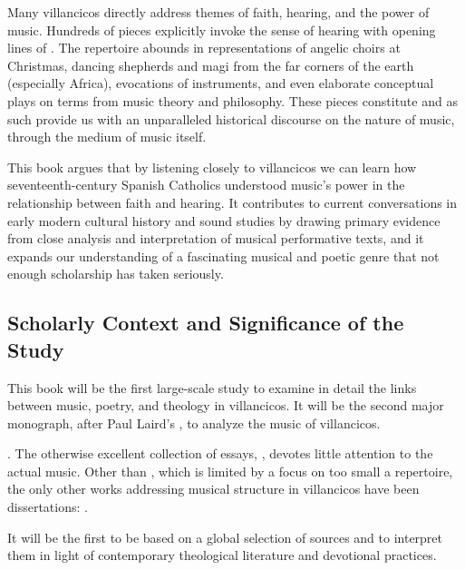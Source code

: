 \documentclass{vcbook-proposal}
\begin{document}
Many villancicos directly address themes of faith, hearing, and the power of 
music.
Hundreds of pieces explicitly invoke the sense of hearing with opening lines of 
  .
The repertoire abounds in representations of angelic choirs at Christmas, 
dancing shepherds and magi from the far corners of the earth (especially 
Africa), evocations of instruments, and even elaborate conceptual plays on 
terms from music theory and philosophy.
These pieces constitute  and as such provide us with 
an unparalleled historical discourse on the nature of music, through the medium 
of music itself.

This book argues that by listening closely to villancicos we can learn how
seventeenth-century Spanish Catholics understood music's power in the
relationship between faith and hearing. 
It contributes to current conversations in early modern cultural history and
sound studies by drawing primary evidence from close analysis and interpretation
of musical performative texts, and it expands our understanding of a fascinating
musical and poetic genre that not enough scholarship has taken seriously.

\subsection{Scholarly Context and Significance of the Study}

This book will be the first large-scale study to examine in detail the links 
between music, poetry, and theology in villancicos.
It will be the second major monograph, after Paul Laird's , to analyze the music of villancicos.%
  \begin{Footnote}
      \Autocite{Laird:VC}. 
      The otherwise excellent collection of essays, 
      \autocite{Knighton-Torrente:VCs}, devotes little attention to the actual music.
      Other than \autocite{Rubio:Forma}, which is limited by a focus on too small a 
      repertoire, the only other works addressing musical structure in villancicos 
      have been dissertations: \autocites{CaberoPueyo:PhD}{Illari:Polychoral}.
  \end{Footnote}
It will be the first to be based on a global selection of sources and to 
interpret them in light of contemporary theological literature and devotional 
practices.
\end{document}
